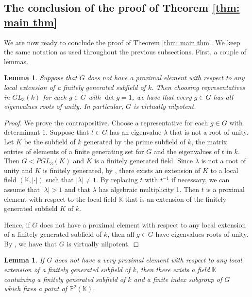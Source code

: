 \documentclass[12pt]{article}
\newtheorem{lem}[thm]{Lemma}
\theoremstyle{definition}
\newcommand{\K}{\mathbb{K}}
\begin{document}
\subsection{The conclusion of the proof of Theorem \ref{thm: main thm}}

We are now ready to conclude the proof of Theorem \ref{thm: main thm}. We keep the same notation as used throughout the previous subsections. First, a couple of lemmas.

\begin{lem}
    \label{lem: No proximal implies virtually nilpotent}
    Suppose that $G$ does not have a proximal element with respect to any local extension of a finitely generated subfield of $k$. Then choosing representatives in $GL_3(k)$ for each $g \in G$ with $\det g = 1$, we have that every $g \in G$ has all eigenvalues roots of unity. In particular, $G$ is virtually nilpotent.
\end{lem}

\begin{proof}
    We prove the contrapositive. Choose a representative for each $g \in G$ with determinant 1. Suppose that $t \in G$ has an eigenvalue $\lambda$ that is not a root of unity. Let $K$ be the subfield of $k$ generated by the prime subfield of $k$, the matrix entries of elements of a finite generating set for $G$ and the eigenvalues of $t$ in $k$. Then $G < PGL_3(K)$ and $K$ is a finitely generated field. Since $\lambda$ is not a root of unity and $K$ is finitely generated, by \cite[Theorem 2.64]{KapDrutu}, there exists an extension of $K$ to a local field $(\mathbb{K}, \vert \cdot \vert)$ such that $\vert \lambda \vert \neq 1$. By replacing $t$ with $t^{-1}$ if necessary, we can assume that $\vert \lambda \vert > 1$ and that $\lambda$ has algebraic multiplicity 1. Then $t$ is a proximal element with respect to the local field $\K$ that is an extension of the finitely generated subfield $K$ of $k$.

    Hence, if $G$ does not have a proximal element with respect to any local extension of a finitely generated subfield of $k$, then all $g \in G$ have eigenvalues roots of unity. By \cite[Theorem 14.46]{KapDrutu}, we have that $G$ is virtually nilpotent. 
\end{proof}

\begin{lem}
    \label{lem: no very proximal implies virtual fixed point on P}
    If $G$ does not have a very proximal element with respect to any local extension of a finitely generated subfield of $k$, then there exists a field $\K$ containing a finitely generated subfield of $k$ and a finite index subgroup of $G$ which fixes a point of $\mathbb{P}^2(\K)$. 
\end{lem}
\end{document}
